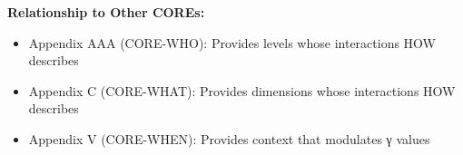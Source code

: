 \begin{tcolorbox}[colback=purple!5!white, colframe=purple!75!black,
    title=Chapter Linkage]
\textbf{Relationship to Other COREs:}
\begin{itemize}[nosep]
\item Appendix AAA (CORE-WHO): Provides levels whose interactions HOW describes
\item Appendix C (CORE-WHAT): Provides dimensions whose interactions HOW describes
\item Appendix V (CORE-WHEN): Provides context that modulates γ values
\end{itemize}

\end{tcolorbox}


